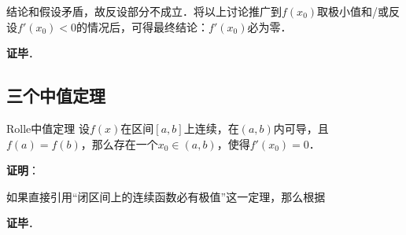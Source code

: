 结论和假设矛盾，故反设部分不成立．将以上讨论推广到$f(x_0)$取极小值和/或反设$f'(x_0)<0$的情况后，可得最终结论：$f'(x_0)$必为零．

\textbf{证毕}．




\subsection{三个中值定理}


\begin{definition}{Rolle中值定理}
设$f(x)$在区间$[a, b]$上连续，在$(a, b)$内可导，且$f(a)=f(b)$，那么存在一个$x_0\in(a, b)$，使得$f'(x_0)=0$．
\end{definition}


\textbf{证明}：

如果直接引用“闭区间上的连续函数必有极值”这一定理，那么根据

\textbf{证毕}．














